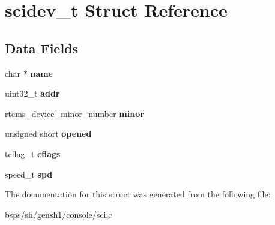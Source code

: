 \hypertarget{structscidev__t}{}\section{scidev\+\_\+t Struct Reference}
\label{structscidev__t}
\subsection*{Data Fields}
\begin{DoxyCompactItemize}
\item 
\mbox{\label{structscidev__t_aa16dd043f29363d37e51582d79e30f99}} 
char $\ast$ {\bfseries name}
\item 
\mbox{\label{structscidev__t_ad131b79947655c33aa6ba9b1d3033a0e}} 
uint32\+\_\+t {\bfseries addr}
\item 
\mbox{\label{structscidev__t_a54a26e6a343330fcc133efae4bfd4823}} 
rtems\+\_\+device\+\_\+minor\+\_\+number {\bfseries minor}
\item 
\mbox{\label{structscidev__t_a4411d6773bdc6e12b968d71f3ab35e4a}} 
unsigned short {\bfseries opened}
\item 
\mbox{\label{structscidev__t_ada1d33bd553f9c58ed0ce1b0cc8bdeef}} 
tcflag\+\_\+t {\bfseries cflags}
\item 
\mbox{\label{structscidev__t_a09eb969fd6f9d403d2a225bef3f67d7e}} 
speed\+\_\+t {\bfseries spd}
\end{DoxyCompactItemize}


The documentation for this struct was generated from the following file\+:\begin{DoxyCompactItemize}
\item 
bsps/sh/gensh1/console/sci.\+c\end{DoxyCompactItemize}
